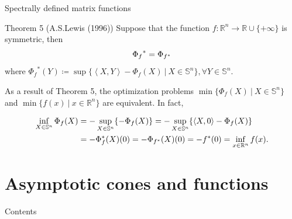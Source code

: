 \documentclass[aspectratio=169, dvipdfmx, 11pt]{beamer} %
\newcommand{\RealNumberSet}{\mathbb{R}}
\newcommand{\NDemenstionalRealEuclidianSpace}{\mathbb{R}^n}
\newcommand{\NDemenstionalRealSymmetricMatrixSpace}{\mathbb{S}^n}
\newcommand{\InnerProduct}[2]{\left\langle {#1},{#2}\right\rangle} %
\newcommand{\ExtendedRealValuedFunction}[2]{{#1}: {#2} \to \RealNumberSet \cup \{+\infty\}}
\newcommand{\ConjugateFunction}[1]{{#1}^*}
\begin{document}
\begin{frame}{Spectrally defined matrix functions}
  \begin{block}{Theorem 5 (A.S.Lewis (1996))}
    Suppose that the function $\ExtendedRealValuedFunction{f}{\NDemenstionalRealEuclidianSpace}$ is symmetric, then
    \begin{equation}
      {\Phi_{f}}^* = \Phi_{f^*} \notag
    \end{equation}
    where ${\Phi_{f}}^* (Y) \coloneqq \sup \{\InnerProduct{X}{Y} - \Phi_{f} (X) \:|\: X \in \NDemenstionalRealSymmetricMatrixSpace\}, \forall Y \in \NDemenstionalRealSymmetricMatrixSpace$.
  \end{block}

  As a result of Theorem 5, the optimization problems $\min \{\Phi_{f}(X) \:|\: X \in \NDemenstionalRealSymmetricMatrixSpace\}$ and $\min \{f(x) \:|\: x \in \NDemenstionalRealEuclidianSpace\}$ are equivalent. In fact,

  \begin{align}
    \inf_{X \in \NDemenstionalRealSymmetricMatrixSpace} \Phi_{f}(X) &= - \sup_{X \in \NDemenstionalRealSymmetricMatrixSpace} \{- \Phi_{f}(X)\} = - \sup_{X \in \NDemenstionalRealSymmetricMatrixSpace} \{\InnerProduct{X}{0} - \Phi_{f}(X)\} \notag \\
    &= - \Phi^*_{f}(X)(0) = - \Phi_{\ConjugateFunction{f}}(X)(0) = - \ConjugateFunction{f}(0) = \inf_{x \in \NDemenstionalRealEuclidianSpace} f(x). \notag
  \end{align}
\end{frame}

\section{Asymptotic cones and functions}
\begin{frame}{Contents}
  \tableofcontents[currentsection]
\end{frame}
\end{document}
